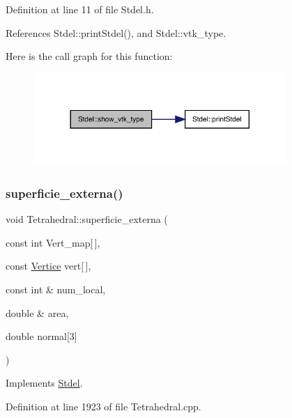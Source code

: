 Definition at line 11 of file Stdel.\+h.



References Stdel\+::print\+Stdel(), and Stdel\+::vtk\+\_\+type.

Here is the call graph for this function\+:
\nopagebreak
\begin{figure}[H]
\begin{center}
\leavevmode
\includegraphics[width=272pt]{classStdel_a56288a857b95a55c8b7eb5b473e836d9_cgraph}
\end{center}
\end{figure}
\mbox{\label{classTetrahedral_a6ec75f700014db243752113389015fae}} 
\subsubsection{\texorpdfstring{superficie\+\_\+externa()}{superficie\_externa()}}
{\footnotesize\ttfamily void Tetrahedral\+::superficie\+\_\+externa (\begin{DoxyParamCaption}\item[{const int}]{Vert\+\_\+map\mbox{[}$\,$\mbox{]},  }\item[{const \hyperlink{structVertice}{Vertice}}]{vert\mbox{[}$\,$\mbox{]},  }\item[{const int \&}]{num\+\_\+local,  }\item[{double \&}]{area,  }\item[{double}]{normal\mbox{[}3\mbox{]} }\end{DoxyParamCaption})\hspace{0.3cm}{\ttfamily [virtual]}}



Implements \hyperlink{classStdel_a4e4aa3bbd0299054ec5447bd73efc6a0}{Stdel}.



Definition at line 1923 of file Tetrahedral.\+cpp.



